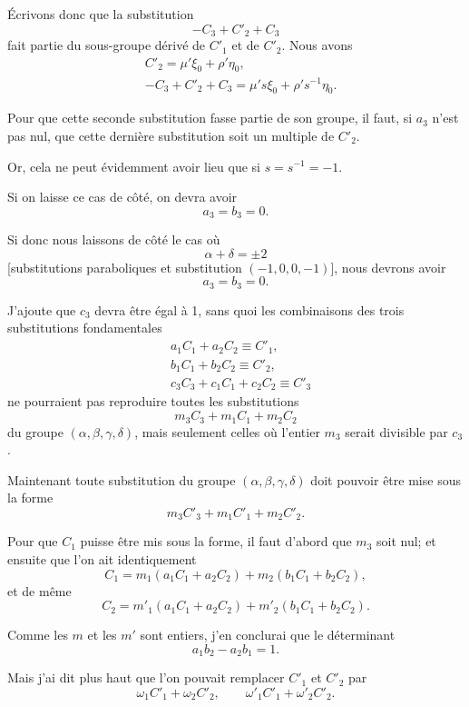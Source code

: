\documentclass{article}
\begin{document}
Écrivons donc que la substitution
\[ -C_{3} + C'_{2} + C_{3} \]
fait partie du sous-groupe dérivé de $C'_{1}$ et de $C'_{2}$. Nous avons
\[ \begin{aligned} &C'_{2} = \mu'\xi_{0} + \rho'\eta_{0},\\ &-C_{3} + C'_{2} + C_{3} = \mu's\xi_{0} + \rho's^{-1}\eta_{0}. \end{aligned} \]

Pour que cette seconde substitution fasse partie de son groupe, il faut, si $a_{3}$ n'est pas nul, que cette dernière substitution soit un multiple de $C'_{2}$.

Or, cela ne peut évidemment avoir lieu que si $s = s^{-1} = -1$.

Si on laisse ce cas de côté, on devra avoir
\[ a_{3} = b_{3} = 0. \]

Si donc nous laissons de côté le cas où
\[ \alpha + \delta = \pm 2 \]
[substitutions paraboliques et substitution $(-1, 0, 0, -1)$], nous devrons avoir
\[ a_{3} = b_{3} = 0. \]

J'ajoute que $c_{3}$ devra être égal à 1, sans quoi les combinaisons des trois substitutions fondamentales
\[ \begin{aligned} &a_{1}C_{1} + a_{2}C_{2} \equiv C'_{1},\\ &b_{1}C_{1} + b_{2}C_{2} \equiv C'_{2},\\ &c_{3}C_{3} + c_{1}C_{1} + c_{2}C_{2} \equiv C'_{3} \end{aligned} \]
ne pourraient pas reproduire toutes les substitutions
\[ m_{3}C_{3} + m_{1}C_{1} + m_{2}C_{2} \]
du groupe $(\alpha, \beta, \gamma, \delta)$, mais seulement celles où l'entier $m_{3}$ serait divisible par $c_{3}$.

Maintenant toute substitution du groupe $(\alpha, \beta, \gamma, \delta)$ doit pouvoir être mise sous la forme
\[ m_{3}C'_{3} + m_{1}C'_{1} + m_{2}C'_{2}. \]

Pour que $C_{1}$ puisse être mis sous la forme, il faut d'abord que $m_{3}$ soit nul; et ensuite que l'on ait identiquement
\[ C_{1} = m_{1}(a_{1}C_{1} + a_{2}C_{2}) + m_{2}(b_{1}C_{1} + b_{2}C_{2}), \]
et de même
\[ C_{2} = m'_{1}(a_{1}C_{1} + a_{2}C_{2}) + m'_{2}(b_{1}C_{1} + b_{2}C_{2}). \]

Comme les $m$ et les $m'$ sont entiers, j'en conclurai que le déterminant
\[ a_{1}b_{2} - a_{2}b_{1} = 1. \]

Mais j'ai dit plus haut que l'on pouvait remplacer $C'_{1}$ et $C'_{2}$ par
\[ \omega_{1}C'_{1} + \omega_{2}C'_{2}, \qquad \omega'_{1}C'_{1} + \omega'_{2}C'_{2}. \]
\end{document}
